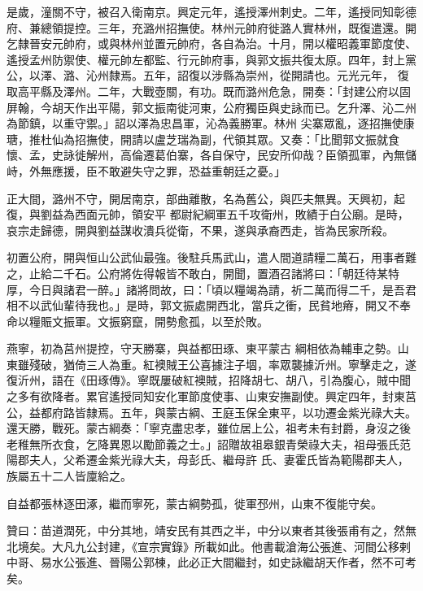 \begin{pinyinscope}
是歲，潼關不守，被召入衛南京。興定元年，遙授澤州刺史。二年，遙授同知彰德府、兼總領提控。三年，充潞州招撫使。林州元帥府徙潞人實林州，既復遣還。開乞隸晉安元帥府，或與林州並置元帥府，各自為治。十月，開以權昭義軍節度使、遙授孟州防禦使、權元帥左都監、行元帥府事，與郭文振共復太原。四年，封上黨公，以澤、潞、沁州隸焉。五年，詔復以涉縣為崇州，從開請也。元光元年，
 復取高平縣及澤州。二年，大戰壺關，有功。既而潞州危急，開奏：「封建公府以固屏翰，今胡天作出平陽，郭文振南徙河東，公府獨臣與史詠而已。乞升澤、沁二州為節鎮，以重守禦。」詔以澤為忠昌軍，沁為義勝軍。林州
 尖寨眾亂，逐招撫使康瑭，推杜仙為招撫使，開請以盧芝瑞為副，代領其眾。又奏：「比聞郭文振就食懷、孟，史詠徙解州，高倫遷葛伯寨，各自保守，民安所仰哉？臣領孤軍，內無儲峙，外無應援，臣不敢避失守之罪，恐益重朝廷之憂。」



 正大間，潞州不守，開居南京，部曲離散，名為舊公，與匹夫無異。天興初，起復，與劉益為西面元帥，領安平
 都尉紀綱軍五千攻衛州，敗績于白公廟。是時，哀宗走歸德，開與劉益謀收潰兵從衛，不果，遂與承裔西走，皆為民家所殺。



 初置公府，開與恒山公武仙最強。後駐兵馬武山，遣人間道請糧二萬石，用事者難之，止給二千石。公府將佐得報皆不敢白，開聞，置酒召諸將曰：「朝廷待某特厚，今日與諸君一醉。」諸將問故，曰：「頃以糧竭為請，祈二萬而得二千，是吾君相不以武仙輩待我也。」是時，郭文振處開西北，當兵之衝，民貧地瘠，開又不奉命以糧賑文振軍。文振窮竄，開勢愈孤，以至於敗。



 燕寧，初為莒州提控，守天勝寨，與益都田琢、東平蒙古
 綱相依為輔車之勢。山東雖殘破，猶倚三人為重。紅襖賊王公喜據注子堌，率眾襲據沂州。寧擊走之，遂復沂州，語在《田琢傳》。寧既屢破紅襖賊，招降胡七、胡八，引為腹心，賊中聞之多有欲降者。累官遙授同知安化軍節度使事、山東安撫副使。興定四年，封東莒公，益都府路皆隸焉。五年，與蒙古綱、王庭玉保全東平，以功遷金紫光祿大夫。還天勝，戰死。蒙古綱奏：「寧克盡忠孝，雖位居上公，祖考未有封爵，身沒之後老稚無所衣食，乞降異恩以勵節義之士。」詔贈故祖皋銀青榮祿大夫，祖母張氏范陽郡夫人，父希遷金紫光祿大夫，母彭氏、繼母許
 氏、妻霍氏皆為範陽郡夫人，族屬五十二人皆廩給之。



 自益都張林逐田涿，繼而寧死，蒙古綱勢孤，徙軍邳州，山東不復能守矣。



 贊曰：苗道潤死，中分其地，靖安民有其西之半，中分以東者其後張甫有之，然無北境矣。大凡九公封建，《宣宗實錄》所載如此。他書載滄海公張進、河間公移剌中哥、易水公張進、晉陽公郭棟，此必正大間繼封，如史詠繼胡天作者，然不可考矣。



\end{pinyinscope}